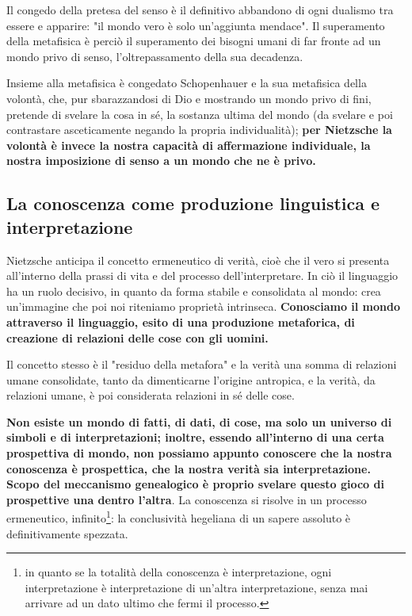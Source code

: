 Il congedo della pretesa del senso è il definitivo abbandono di  ogni dualismo tra essere e apparire: "il mondo vero è solo un'aggiunta mendace". Il superamento della metafisica è perciò il superamento dei bisogni umani di far fronte ad un mondo privo di senso, l'oltrepassamento della sua decadenza.

Insieme alla metafisica è congedato Schopenhauer e la sua metafisica della volontà, che, pur sbarazzandosi di Dio e mostrando un mondo privo di fini, pretende di svelare la cosa in sé, la sostanza ultima del mondo (da svelare e poi contrastare asceticamente negando la propria individualità); \textbf{per Nietzsche la volontà è invece la nostra capacità di affermazione individuale, la nostra imposizione di senso a un mondo che ne è privo.}

\subsection{La conoscenza come produzione linguistica e interpretazione}

Nietzsche anticipa il concetto ermeneutico di verità, cioè che il vero si presenta all'interno della prassi di vita e del processo dell'interpretare. In ciò il linguaggio ha un ruolo decisivo, in quanto da forma stabile e consolidata al mondo: crea un'immagine che poi noi riteniamo proprietà intrinseca. \textbf{Conosciamo il mondo attraverso il linguaggio, esito di una produzione metaforica, di creazione di relazioni delle cose con gli uomini.}

Il concetto stesso è il "residuo della metafora" e la verità una somma di relazioni umane consolidate, tanto da dimenticarne l'origine antropica, e la verità, da relazioni umane, è poi considerata relazioni in sé delle cose.

\textbf{Non esiste un mondo di fatti, di dati, di cose, ma solo un universo di simboli e di interpretazioni; inoltre, essendo all'interno di una certa prospettiva di mondo, non possiamo appunto conoscere che la nostra conoscenza è prospettica, che la nostra verità sia interpretazione. Scopo del meccanismo genealogico è proprio svelare questo gioco di prospettive una dentro l'altra}. La conoscenza si risolve in un processo ermeneutico, infinito\footnote{in quanto se la totalità della conoscenza è interpretazione, ogni interpretazione è interpretazione di un'altra interpretazione, senza mai arrivare ad un dato ultimo che fermi il processo.}: la conclusività hegeliana di un sapere assoluto è definitivamente spezzata.

